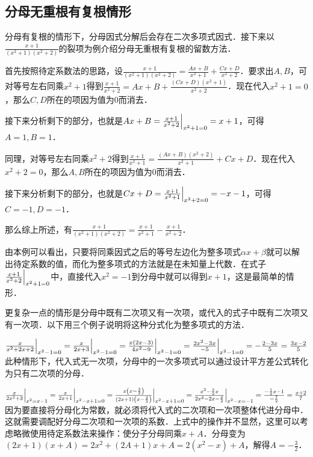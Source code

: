 \documentclass{ctexbook}
\begin{document}
\subsection{分母无重根有复根情形}
分母有复根的情形下，分母因式分解后会存在二次多项式因式．接下来以$\frac{x+1}{\left(x^{2}+1\right)\left(x^{2}+2\right)}$的裂项为例介绍分母无重根有复根的留数方法．\par
首先按照待定系数法的思路，设$\frac{x+1}{\left(x^{2}+1\right)\left(x^{2}+2\right)}=\frac{Ax+B}{x^{2}+1}+\frac{Cx+D}{x^{2}+2}$．要求出$A,B$，可对等号左右同乘$x^{2}+1$得到$\frac{x+1}{x^{2}+2}=Ax+B+\frac{\left(Cx+D\right)\left(x^{2}+1\right)}{x^{2}+2}$．现在代入$x^{2}+1=0$，那么$C,D$所在的项因为值为$0$而消去．\par
接下来分析剩下的部分，也就是$Ax+B=\frac{x+1}{x^{2}+2}\Big{|}_{x^{2}+1=0}=x+1$，可得$A=1,B=1$．\par
同理，对等号左右同乘$x^{2}+2$得到$\frac{x+1}{x^{2}+1}=\frac{\left(Ax+B\right)\left(x^{2}+2\right)}{x^{2}+1}+Cx+D$．现在代入$x^{2}+2=0$，那么$A,B$所在的项因为值为$0$而消去．\par
接下来分析剩下的部分，也就是$Cx+D=\frac{x+1}{x^{2}+1}\Big{|}_{x^{2}+2=0}=-x-1$，可得$C=-1,D=-1$．\par
那么综上所述，有$\frac{x+1}{\left(x^{2}+1\right)\left(x^{2}+2\right)}=\frac{x+1}{x^{2}+1}-\frac{x+1}{x^{2}+2}$．\par
由本例可以看出，只要将同乘因式之后的等号左边化为整多项式$\alpha x+\beta$就可以解出待定系数的值，而化为整多项式的方法就是在未知量上代数．在式子$\frac{x+1}{x^{2}+2}\Big{|}_{x^{2}+1=0}$中，直接代入$x^{2}=-1$到分母中就可以得到$x+1$，这是最简单的情形．\par
更复杂一点的情形是分母中既有二次项又有一次项，或代入的式子中既有二次项又有一次项．以下用三个例子说明将这种分式化为整多项式的方法．\par
$\frac{x}{x^{2}+2x+2}\Big{|}_{x^{2}-1=0}=\frac{x}{2x+3}\Big{|}_{x^{2}-1=0}=\frac{x\left(2x-3\right)}{4x^{2}-9}\Big{|}_{x^{2}-1=0}=\frac{2x^{2}-3x}{-5}\Big{|}_{x^{2}-1=0}=-\frac{2-3x}{5}=\frac{3x-2}{5}$\\
此种情形下，代入式无一次项，分母中的一次多项式可以通过设计平方差公式转化为只有二次项的分母．\par
$\frac{x}{2x^{2}+3}\Big{|}_{x^{2}=x-1}=\frac{x}{2x+1}\Big{|}_{x^{2}-x+1=0}=\frac{x\left(x-\frac{3}{2}\right)}{\left(2x+1\right)\left(x-\frac{2}{3}\right)}\Big{|}_{x^{2}-x+1=0}=\frac{x^{2}-\frac{3}{2}x}{2x^{2}-2x-\frac{3}{2}}\Big{|}_{x^{2}-x=-1}=\frac{-\frac{1}{2}x-1}{-\frac{7}{2}}=\frac{x+2}{7}$\\
因为要直接将分母化为常数，就必须将代入式的二次项和一次项整体代进分母中．这就需要调配好分母二次项和一次项的系数．上式中的操作并不显然，这里可以考虑略微使用待定系数法来操作：使分子分母同乘$x+A$．分母变为$\left(2x+1\right)\left(x+A\right)=2x^{2}+\left(2A+1\right)x+A=2\left(x^{2}-x\right)+A$，解得$A=-\frac{3}{2}$．\par
\end{document}
